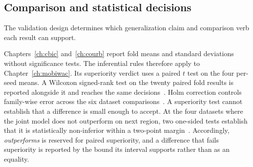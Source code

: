 
\subsection{Comparison and statistical decisions}

The validation design determines which generalization claim and comparison verb each
result can support.

Chapters~\ref{ch:cbic} and~\ref{ch:courb} report fold means and standard deviations
without significance tests. The inferential rules therefore apply to
Chapter~\ref{ch:mobiwac}. Its superiority verdict uses a paired $t$ test on the four
per-seed means. A Wilcoxon signed-rank test on the twenty paired fold results is
reported alongside it and reaches the same decisions~\cite{wilcoxon1945}. Holm
correction controls family-wise error across the six dataset
comparisons~\cite{holm1979}. A superiority test cannot establish that a difference is
small enough to accept. At the four datasets where the joint model does not outperform on next region, two one-sided tests
establish that it is statistically non-inferior within a two-point margin~\cite{lakens2017tost}. Accordingly, \emph{outperforms} is reserved for paired
superiority, and a difference that fails superiority is reported by the bound its interval
supports rather than as an equality.


